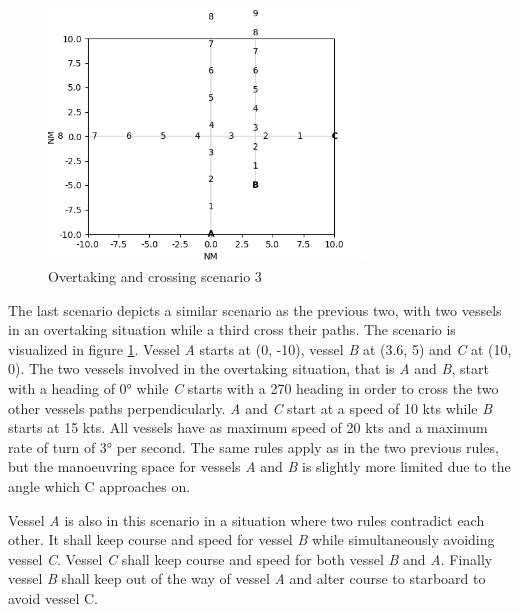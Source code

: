 \begin{figure}[H]
    \centering
    \includegraphics[width=0.75\textwidth,height=0.75\textheight,keepaspectratio]{../src/img/overtaking_crossing_2.png}
    \caption[Overtaking and crossing scenario 3]{Overtaking and crossing scenario 3 \cite{ecolreg_overtaking-and-crossing-2}}
    \label{fig:overtaking-and-crossing-2}
\end{figure}

The last scenario depicts a similar scenario as the previous two, with two vessels in an overtaking situation while a third cross their paths. The scenario is visualized in figure \ref{fig:overtaking-and-crossing-2}. Vessel \textit{A} starts at (0, -10), vessel \textit{B} at (3.6, 5) and \textit{C} at (10, 0). The two vessels involved in the overtaking situation, that is \textit{A} and \textit{B}, start with a heading of \ang{0}  while  \textit{C} starts with a {270} heading in order to cross the two other vessels paths perpendicularly. \textit{A} and \textit{C} start at a speed of 10 kts while \textit{B} starts at 15 kts. All vessels have as maximum speed of 20 kts and a maximum rate of turn of \ang{3} per second. The same rules apply as in the two previous rules, but the manoeuvring space for vessels \textit{A} and \textit{B} is slightly more limited due to the angle which C approaches on.

Vessel \textit{A} is also in this scenario in a situation where two rules contradict each other.
It shall keep course and speed for vessel \textit{B} while simultaneously avoiding vessel \textit{C}.
Vessel \textit{C} shall keep course and speed for both vessel \textit{B} and \textit{A}.
Finally vessel \textit{B} shall keep out of the way of vessel \textit{A} and alter course to starboard to avoid vessel C.

